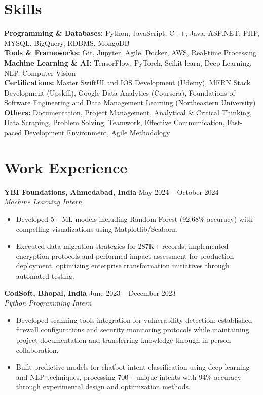 \documentclass[a4paper,10pt]{article}
\begin{document}
\section*{Skills}
\textbf{Programming \& Databases: } Python, JavaScript, C++, Java, ASP.NET, PHP, MYSQL, BigQuery, RDBMS, MongoDB \\
\textbf{Tools \& Frameworks:}   Git, Jupyter, Agile, Docker, AWS, Real-time Processing\\
\textbf{Machine Learning \& AI: } TensorFlow, PyTorch, Scikit-learn, Deep Learning, NLP, Computer Vision  \\
\textbf{Certifications:} Master SwiftUI and IOS Development (Udemy), MERN Stack Development (Upskill), Google Data Analytics (Coursera), Foundations of Software Engineering and Data Management Learning (Northeastern University) \\
\textbf{Others: }Documentation, Project Management, Analytical \& Critical Thinking, Data Scraping, Problem Solving, Teamwork, Effective Communication, Fast-paced Development Environment, Agile Methodology \\

\vspace{-4mm}

\section*{Work Experience}
\textbf{YBI Foundations, Ahmedabad, India} \hfill May 2024 -- October 2024\\
\textit{Machine Learning Intern} \\
\begin{itemize}[leftmargin=*, itemsep=0pt, parsep=1pt]
\vspace{-6mm}
\item Developed 5+ ML models including Random Forest (92.68\% accuracy) with compelling visualizations using Matplotlib/Seaborn.
\item Executed data migration strategies for 287K+ records; implemented encryption protocols and performed impact assessment for production deployment, optimizing enterprise transformation initiatives through automated testing.
\end{itemize}
\textbf{CodSoft, Bhopal, India} \hfill June 2023 -- December 2023\\
\textit{Python Programming Intern} \\
\begin{itemize}[leftmargin=*, itemsep=0pt, parsep=1pt]
\vspace{-6mm}
\item Developed scanning tools integration for vulnerability detection; established firewall configurations and security monitoring protocols while maintaining project documentation and transferring knowledge through in-person collaboration.
\item Built predictive models for chatbot intent classification using deep learning and NLP techniques, processing 700+ unique intents with 94\% accuracy through experimental design and optimization methods.
\vspace{-1mm}
\end{itemize}
\end{document}
